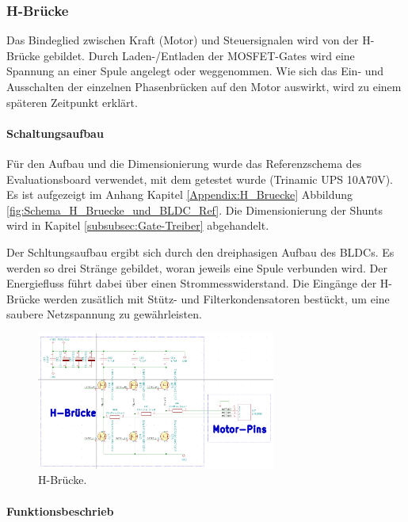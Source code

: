 \subsubsection{H-Brücke}
\label{subsubsec:H-Brücke}

Das Bindeglied zwischen Kraft (Motor) und Steuersignalen wird von der H-Brücke gebildet. Durch Laden-/Entladen der MOSFET-Gates wird eine Spannung an einer Spule angelegt oder weggenommen. Wie sich das Ein- und Ausschalten der einzelnen Phasenbrücken auf den Motor auswirkt, wird zu einem späteren Zeitpunkt erklärt.

\paragraph{Schaltungsaufbau}\mbox{}

Für den Aufbau und die Dimensionierung wurde das Referenzschema des Evaluationsboard verwendet, mit dem getestet wurde (Trinamic UPS 10A70V). Es ist aufgezeigt im Anhang Kapitel \ref{Appendix:H_Bruecke} Abbildung \ref{fig:Schema_H_Bruecke_und_BLDC_Ref}. Die Dimensionierung der Shunts wird in Kapitel \ref{subsubsec:Gate-Treiber} abgehandelt.

Der Schltungsaufbau ergibt sich durch den dreiphasigen Aufbau des BLDCs. Es werden so drei Stränge gebildet, woran jeweils eine Spule verbunden wird. Der Energiefluss führt dabei über einen Strommesswiderstand. Die Eingänge der H-Brücke werden zusätlich mit Stütz- und Filterkondensatoren bestückt, um eine saubere Netzspannung zu gewährleisten.

\begin{figure}[h!]
	\centering
	\includegraphics[width=0.7\textwidth]{graphics/Schema_H_Bruecke_und_BLDC}
	\caption{H-Brücke.}
	\label{fig:Schema_H_Bruecke_und_BLDC}
\end{figure}

\newpage

\paragraph{Funktionsbeschrieb}\mbox{}

